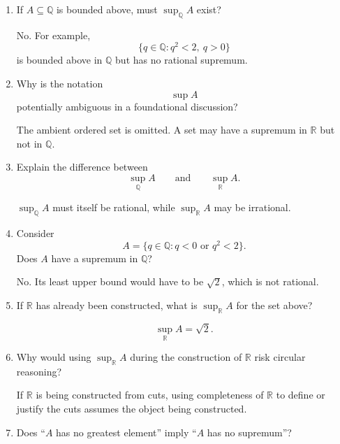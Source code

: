 \documentclass{self-check}
\begin{document}
\begin{enumerate}[label=\arabic{*}., itemsep=10pt]
    \begin{answer}
      Yes. Choose any \(b\in B\). Since every \(a\in A\) satisfies \(a<b\), the number \(b\) is a rational upper bound of \(A\).
    \end{answer}
  \item If \(A\subseteq\mathbb{Q}\) is bounded above, must \(\sup_{\mathbb{Q}}A\) exist?

    \begin{answer}
      No. For example,
      \[ \{q\in\mathbb{Q}:q^{2}<2,\ q>0\} \]
      is bounded above in \(\mathbb{Q}\) but has no rational supremum.
    \end{answer}
  \item Why is the notation
    \[ \sup A \]
    potentially ambiguous in a foundational discussion?

    \begin{answer}
      The ambient ordered set is omitted. A set may have a supremum in \(\mathbb{R}\) but not in \(\mathbb{Q}\).
    \end{answer}
  \item Explain the difference between
    \[ \sup_{\mathbb{Q}}A \qquad\text{and}\qquad \sup_{\mathbb{R}}A. \]

    \begin{answer}
      \(\sup_{\mathbb{Q}}A\) must itself be rational, while \(\sup_{\mathbb{R}}A\) may be irrational.
    \end{answer}
  \item Consider
    \[ A=\{q\in\mathbb{Q}:q<0\text{ or }q^{2}<2\}. \]
    Does \(A\) have a supremum in \(\mathbb{Q}\)?

    \begin{answer}
      No. Its least upper bound would have to be \(\sqrt{2}\), which is not rational.
    \end{answer}
  \item If \(\mathbb{R}\) has already been constructed, what is \(\sup_{\mathbb{R}}A\) for the set above?

    \begin{answer}
      \[ \sup_{\mathbb{R}}A=\sqrt{2}. \]
    \end{answer}
  \item Why would using \(\sup_{\mathbb{R}}A\) during the construction of \(\mathbb{R}\) risk circular reasoning?

    \begin{answer}
      If \(\mathbb{R}\) is being constructed from cuts, using completeness of \(\mathbb{R}\) to define or justify the cuts assumes the object being constructed.
    \end{answer}
  \item Does ``\(A\) has no greatest element'' imply ``\(A\) has no supremum''?


\end{enumerate}
\end{document}
